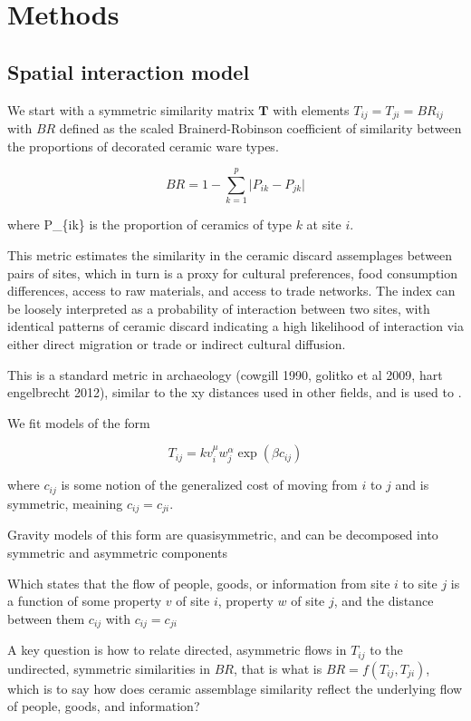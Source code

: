 \documentclass[10pt,letterpaper]{article}
\begin{document}
\section{Methods}\label{methods}

\subsection{Spatial interaction model}\label{spatial-interaction-model}

We start with a symmetric similarity matrix \(\mathbf{T}\) with elements
\(T_{ij} = T_{ji} = BR_{ij}\) with \(BR\) defined as the scaled
Brainerd-Robinson coefficient of similarity between the proportions of
decorated ceramic ware types.

\[BR = 1 - \sum_{k=1}^{p} \lvert P_{ik} - P_{jk} \rvert\]

where P\_\{ik\} is the proportion of ceramics of type \(k\) at site
\(i\).

This metric estimates the similarity in the ceramic discard assemplages
between pairs of sites, which in turn is a proxy for cultural
preferences, food consumption differences, access to raw materials, and
access to trade networks. The index can be loosely interpreted as a
probability of interaction between two sites, with identical patterns of
ceramic discard indicating a high likelihood of interaction via either
direct migration or trade or indirect cultural diffusion.

This is a standard metric in archaeology (cowgill 1990, golitko et al
2009, hart engelbrecht 2012), similar to the xy distances used in other
fields, and is used to .

We fit models of the form

\[T_{ij} = k v_i^\mu w_j^\alpha \exp(\beta c_{ij})\]

where \(c_{ij}\) is some notion of the generalized cost of moving from
\(i\) to \(j\) and is symmetric, meaining \(c_{ij} = c_{ji}\).

Gravity models of this form are quasisymmetric, and can be decomposed
into symmetric and asymmetric components

Which states that the flow of people, goods, or information from site
\(i\) to site \(j\) is a function of some property \(v\) of site \(i\),
property \(w\) of site \(j\), and the distance between them \(c_{ij}\)
with \(c_{ij} = c_{ji}\)

A key question is how to relate directed, asymmetric flows in \(T_{ij}\)
to the undirected, symmetric similarities in \(BR\), that is what is
\(BR = f(T_{ij},T_{ji})\), which is to say how does ceramic assemblage
similarity reflect the underlying flow of people, goods, and
information?
\end{document}
